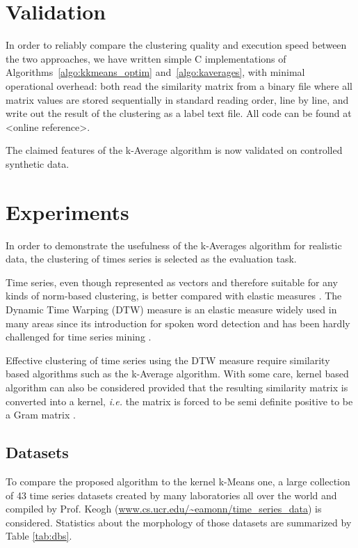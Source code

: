 \documentclass[a4paper,twoside]{article}
\begin{document}
\section{Validation}
\label{sec:validation}

In order to reliably compare the clustering quality and execution speed between the two approaches, we have written simple C implementations of Algorithms~\ref{algo:kkmeans_optim} and~\ref{algo:kaverages}, with minimal operational overhead: both read the similarity matrix from a binary file where all matrix values are stored sequentially in standard reading order, line by line, and write out the result of the clustering as a label text file. All code can be found at <online reference>.

The claimed features of the k-Average algorithm is now validated on controlled synthetic data.


\section{Experiments}
\label{sec:experiments}

In order to demonstrate the usefulness of the k-Averages algorithm for realistic data, the clustering of times series is selected as the evaluation task.

Time series, even though represented as vectors and therefore suitable for any kinds of norm-based clustering, is better compared with elastic measures \cite{Ding:2008:QMT:1454159.1454226, Wang:2013:ECR:2429736.2429754}. The Dynamic Time Warping (DTW) measure is an elastic measure widely used in many areas since its introduction for spoken word detection \cite{1163055} and has been hardly challenged for time series mining \cite{conf/kdd/BerndtC94, Rakthanmanon:2013:ABD:2513092.2500489}.

Effective clustering of time series using the DTW measure require similarity based algorithms such as the k-Average algorithm. With some care, kernel based algorithm can also be considered provided that the resulting similarity matrix is converted into a kernel, \textit{i.e.} the matrix is forced to be semi definite positive to be a Gram matrix \cite{Lanckriet:2004:LKM:1005332.1005334}.

\subsection{Datasets}

To compare the proposed algorithm to the kernel k-Means one, a large collection of 43 time series datasets created by many laboratories all over the world and compiled by Prof. Keogh (\url{www.cs.ucr.edu/~eamonn/time_series_data}) is considered.  Statistics about the morphology of those datasets are summarized by Table \ref{tab:dbs}.
\end{document}
